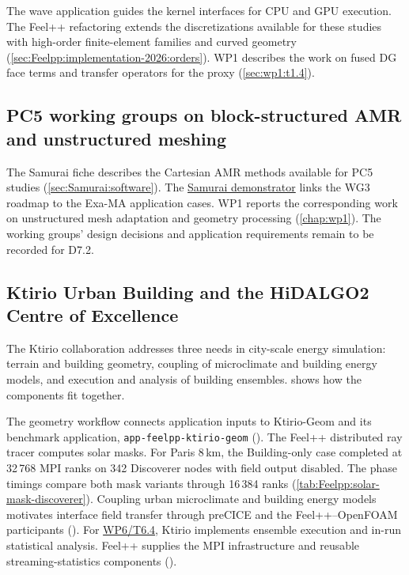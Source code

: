 The wave application guides the kernel interfaces for CPU and GPU
execution. The Feel++ refactoring extends the discretizations
available for these studies with high-order finite-element families and
curved geometry (\cref{sec:Feelpp:implementation-2026:orders}). WP1 describes
the work on fused DG face terms and transfer operators for the proxy
(\cref{sec:wp1:t1.4}).

\subsection{PC5 working groups on block-structured AMR and unstructured meshing}

The Samurai fiche describes the Cartesian AMR methods available for
PC5 studies (\cref{sec:Samurai:software}). The
\hyperref[sec:pc5:samurai]{Samurai demonstrator} links the WG3 roadmap
to the Exa-MA application cases. WP1 reports the corresponding
work on unstructured mesh adaptation and geometry processing
(\cref{chap:wp1}). The working groups' design decisions and application
requirements remain to be recorded for D7.2.

\subsection{Ktirio Urban Building and the HiDALGO2 Centre of Excellence}

The Ktirio collaboration addresses three needs in city-scale energy
simulation: terrain and building geometry, coupling of microclimate and
building energy models, and execution and analysis of building ensembles.
 shows how the components fit together.

The geometry workflow connects application inputs to Ktirio-Geom and its
benchmark application, \texttt{app-feelpp-ktirio-geom}
(). The Feel++ distributed ray
tracer computes solar masks. For Paris 8\,km, the Building-only case
completed at 32\,768 MPI ranks on 342 Discoverer nodes with field output
disabled. The phase timings compare both mask variants through
16\,384 ranks (\cref{tab:Feelpp:solar-mask-discoverer}). Coupling urban microclimate and
building energy models motivates interface field transfer through preCICE
and the Feel++--OpenFOAM participants
(). For
\hyperref[sec:wp6:ensemble-streaming]{WP6/T6.4}, Ktirio implements ensemble
execution and in-run statistical analysis. Feel++ supplies the MPI
infrastructure and reusable streaming-statistics components
().

